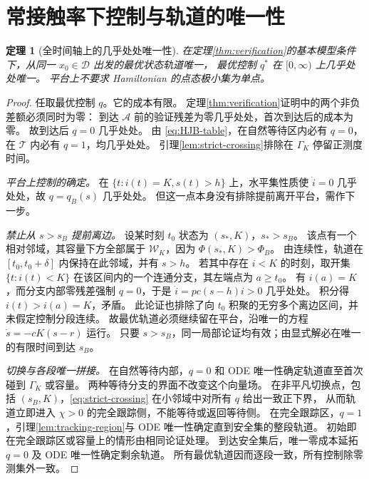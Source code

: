 \documentclass[11pt,a4paper,UTF8]{ctexart}
\newtheorem{theorem}{定理}[section]
\theoremstyle{definition}
\newcommand{\Acal}{\mathcal A}
\newcommand{\Dcal}{\mathcal D}
\begin{document}
\section{常接触率下控制与轨道的唯一性}
\label{sec:constant-uniqueness}
\begin{theorem}[全时间轴上的几乎处处唯一性]
\label{thm:unique-q}
在定理\ref{thm:verification}的基本模型条件下，从同一 $x_0\in\Dcal$ 出发的最优状态轨道唯一，
最优控制 $q^*$ 在 $[0,\infty)$ 上几乎处处唯一。
平台上不要求 Hamiltonian 的点态极小集为单点。
\end{theorem}
\begin{proof}
任取最优控制 $q$。它的成本有限。
定理\ref{thm:verification}证明中的两个非负差额必须同时为零：
到达 $\Acal$ 前的验证残差为零几乎处处，首次到达后的成本为零。
故到达后 $q=0$ 几乎处处。
由 \eqref{eq:HJB-table}，在自然等待区内必有 $q=0$，在 $\mathcal T$ 内必有 $q=1$，均几乎处处。
引理\ref{lem:strict-crossing}排除在 $\Gamma_K$ 停留正测度时间。

\emph{平台上控制的确定。}
在 $\{t:i(t)=K,s(t)>h\}$ 上，水平集性质使 $\dot i=0$ 几乎处处，故 $q=q_B(s)$ 几乎处处。
但这一点本身没有排除提前离开平台，需作下一步。

\emph{禁止从 $s>s_B$ 提前离边。}
设某时刻 $t_0$ 状态为 $(s_*,K)$，$s_*>s_B$。
该点有一个相对邻域，其容量下方全部属于 $\mathcal W_K$，因为 $\Phi(s_*,K)>\Phi_B$。
由连续性，轨道在 $[t_0,t_0+\delta]$ 内保持在此邻域，并有 $s>h$。
若其中存在 $i<K$ 的时刻，取开集 $\{t:i(t)<K\}$ 在该区间内的一个连通分支，其左端点为 $a\ge t_0$。
有 $i(a)=K$，而分支内部零残差强制 $q=0$，于是 $\dot i=pc(s-h)i>0$ 几乎处处。
积分得 $i(t)>i(a)=K$，矛盾。
此论证也排除了向 $t_0$ 积聚的无穷多个离边区间，并未假定控制分段连续。
故最优轨道必须继续留在平台，沿唯一的方程 $\dot s=-cK(s-r)$ 运行。
只要 $s>s_B$，同一局部论证均有效；由显式解必在唯一的有限时间到达 $s_B$。

\emph{切换与各段唯一拼接。}
在自然等待内部，$q=0$ 和 ODE 唯一性确定轨道直至首次碰到 $\Gamma_K$ 或容量。
两种等待分支的界面不改变这个向量场。
在非平凡切换点，包括 $(s_B,K)$，\eqref{eq:strict-crossing} 在小邻域中对所有 $q$ 给出一致正下界，
从而轨道立即进入 $\chi>0$ 的完全跟踪侧，不能等待或返回等待侧。
在完全跟踪区，$q=1$，引理\ref{lem:tracking-region}与 ODE 唯一性确定直到安全集的整段轨道。
初始即在完全跟踪区或容量上的情形由相同论证处理。
到达安全集后，唯一零成本延拓 $q=0$ 及 ODE 唯一性确定剩余轨道。
所有最优轨道因而逐段一致，所有控制除零测集外一致。
\end{proof}
\end{document}
